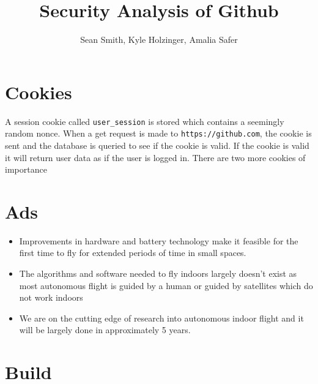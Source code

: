 \documentclass{lposter}
\author{Sean Smith, Kyle Holzinger, Amalia Safer}
\title{Security Analysis of Github}
\theoremstyle{plain}
\theoremstyle{definition}
\renewcommand{\tt}[1]{\texttt{#1}}
\begin{document}
\begin{poster}




\section{Cookies}

A session cookie called \tt{user\_session} is stored which contains a seemingly random nonce. When a get request is made to \tt{https://github.com}, the cookie is sent and the database is queried to see if the cookie is valid. If the cookie is valid it will return user data as if the user is logged in. There are two more cookies of importance \tt{}



\section{Ads}

\begin{itemize}
\item Improvements in hardware and battery technology make it feasible for the first time to fly for extended periods of time in small spaces.
\item The algorithms and software needed to fly indoors largely doesn't exist as most autonomous flight is guided by a human or guided by satellites which do not work indoors
\item We are on the cutting edge of research into autonomous indoor flight and it will be largely done in approximately 5 years.  

\end{itemize}

\section{Build}


\end{poster}
\end{document}

